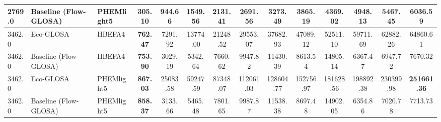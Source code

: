 \begin{table}[htb]
{\begin{tabular}{l l l *{11}{c}}
      2769.0& Baseline (Flow-GLOSA)      & PHEMlight5   & \textbf{305.10}     & 944.66     & 1549.56    & 2131.41    & 2691.56    & 3273.49    & 3865.19    & 4369.02    & 4948.13    & 5467.45    & 6036.59    \\
      \midrule
      3462.0& Eco-GLOSA                  & HBEFA4       & \textbf{762.47}     & 7291.92    & 13774.00   & 21248.52   & 29553.07   & 37682.93   & 47089.12   & 52511.10   & 59711.69   & 62882.26   & 64860.61   \\
      3462.0& Baseline (Flow-GLOSA)      & HBEFA4       & \textbf{753.90}     & 3029.19 & 5342.64    & 7660.62    & 9947.82    & 11430.39   & 8613.54    & 14805.14   & 6367.47    & 6947.72    & 7670.32    \\
      3462.0& Eco-GLOSA                  & PHEMlight5   & \textbf{867.03}     & 25083.58   & 59247.59   & 87348.07   & 112061.03  & 128604.77  & 152756.97  & 181628.56  & 198892.38  & 230399.98  & \textbf{251661.36} \\
      3462.0& Baseline (Flow-GLOSA)      & PHEMlight5   & \textbf{858.37}     & 3133.66    & 5465.48    & 7801.65    & 9987.87    & 11538.38   & 8697.48    & 14902.05   & 6354.86    & 7020.78    & 7713.73    \\
      \bottomrule
    \end{tabular}%
  }
\end{table}

